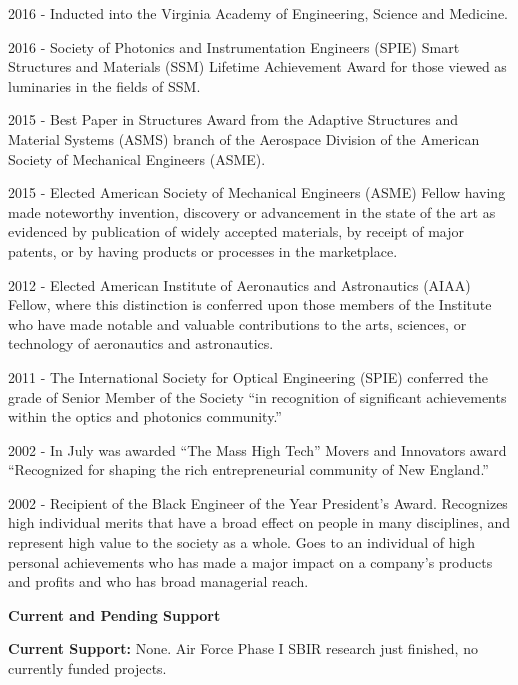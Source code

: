 \documentclass[11pt]{article}
\newcommand{\PubSpace}{\vspace{-0.12cm}}  %
\begin{document}
\PubSpace
2016 - Inducted into the Virginia Academy of Engineering, Science and Medicine.

\PubSpace
2016 - Society of Photonics and Instrumentation Engineers (SPIE) Smart Structures and Materials (SSM) Lifetime Achievement Award for those viewed as luminaries in the fields of SSM.

\PubSpace
2015 - Best Paper in Structures Award from the Adaptive Structures and Material Systems (ASMS) branch of the Aerospace Division of the American Society of Mechanical Engineers (ASME).

\PubSpace
2015 - Elected American Society of Mechanical Engineers (ASME) Fellow having made noteworthy invention, discovery or advancement in the state of the art as evidenced by publication of widely accepted materials, by receipt of major patents, or by having products or processes in the marketplace.

\PubSpace
2012 - Elected American Institute of Aeronautics and Astronautics (AIAA) Fellow, where this distinction is conferred upon those members of the Institute who have made notable and valuable contributions to the arts, sciences, or technology of aeronautics and astronautics.

\PubSpace
2011 - The International Society for Optical Engineering (SPIE) conferred the grade of Senior Member of the Society ``in recognition of significant achievements within the optics and photonics community.''

\PubSpace
2002 - In July was awarded ``The Mass High Tech'' Movers and Innovators award ``Recognized for shaping the rich entrepreneurial community of New England.''

\PubSpace
2002 - Recipient of the Black Engineer of the Year President's Award.  Recognizes high individual merits that have a broad effect on people in many disciplines, and represent high value to the society as a whole.  Goes to an individual of high personal achievements who has made a major impact on a company's products and profits and who has broad managerial reach.








\newpage
{\bf \Huge Current and Pending Support \\}


{\bf Current Support:}  None.  Air Force Phase I SBIR research just finished, no currently funded projects.
\end{document}
